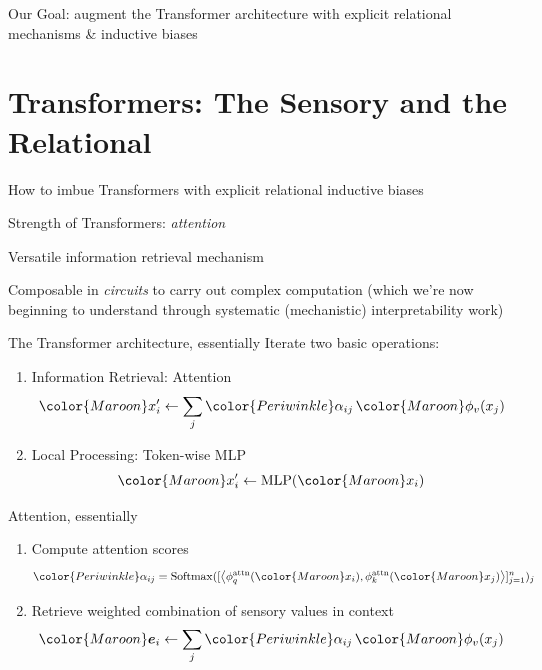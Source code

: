 \documentclass[xcolor={dvipsnames}]{beamer}
\newcommand{\senscolor}[1]{{\color{Maroon} #1 }}
\newcommand{\attncolor}[1]{{\color{Periwinkle} #1 }}
\begin{document}
\begin{frame}[standout]
    Our Goal: augment the Transformer architecture with explicit relational mechanisms \& inductive biases
\end{frame}

\section{Transformers: The Sensory and the Relational}
\begin{frame}{How to imbue Transformers with explicit relational inductive biases}

    Strength of Transformers: \alert{\emph{attention}}

    Versatile \alert{information retrieval} mechanism

    Composable in \alert{\textit{circuits}} to carry out complex computation\newline
    \tiny{(which we're now beginning to understand through systematic (mechanistic) interpretability work)}
\end{frame}

\begin{frame}{The Transformer architecture, essentially}
    Iterate two basic operations:
    \begin{enumerate}
        \item \alert{Information Retrieval}: Attention
        \[\senscolor{x_i'} \gets \sum_{j} \attncolor{\alpha_{ij}} \, \senscolor{\phi_v(x_j)}\]
        \item \alert{Local Processing}: Token-wise MLP
        \[\senscolor{x_i'} \gets \mathrm{MLP}(\senscolor{x_i})\]
    \end{enumerate}
\end{frame}

\begin{frame}{Attention, essentially}
    \begin{enumerate}
        \item Compute attention scores
        \[\attncolor{\alpha_{ij}} = \mathrm{Softmax}([\iprod{\phiqattn(\senscolor{x_i})}{\phikattn(\senscolor{x_j})}]_{j=1}^{n})_j\]
        \item Retrieve weighted combination of sensory values in context
        \[\senscolor{\bm{e}_i} \gets \sum_{j} \attncolor{\alpha_{ij}} \, \senscolor{\phi_v(x_j)}\]
    \end{enumerate}
\end{frame}
\end{document}
